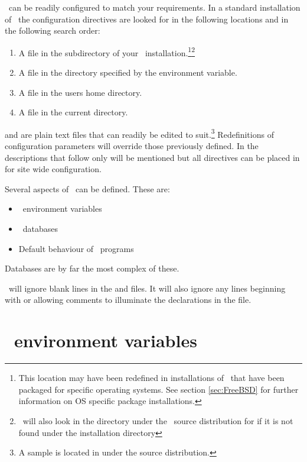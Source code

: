 \documentclass{report}
\begin{document}
\EMBOSS\ can be readily configured to match your requirements. In a standard installation of \EMBOSS\ the configuration directives are looked for in the following locations and in the following search order:
\begin{enumerate}
\item A file  in the  subdirectory of your \EMBOSS\ installation.\footnote{This location may have been redefined in installations of \EMBOSS\ that have been packaged for specific operating systems. See section \ref{sec:FreeBSD} for further information on OS specific package installations.}\footnote{\EMBOSS\ will also look in the  directory under the \EMBOSS\ source distribution for  if it is not found under the installation directory}
\item A file  in the directory specified by the  environment variable.
\item A file  in the users home directory.
\item A file  in the current directory.
\end{enumerate}
 and  are plain text files that can readily be edited to suit.\footnote{A sample  is located in  under the  source distribution.} Redefinitions of configuration parameters will override those previously defined. In the descriptions that follow only  will be mentioned but all directives can be placed in  for site wide configuration.

Several aspects of \EMBOSS\ can be defined. These are:
\begin{itemize}
\item\EMBOSS\ environment variables
\item\EMBOSS\ databases
\item Default behaviour of \EMBOSS\ programs
\end{itemize}
Databases are by far the most complex of these. 

\EMBOSS\ will ignore blank lines in the  and  files. It will also ignore any lines beginning with \ilcomm{\#} or \ilcomm{!} allowing comments to illuminate the declarations in the file.


\section{\EMBOSS\ environment variables}
\end{document}
